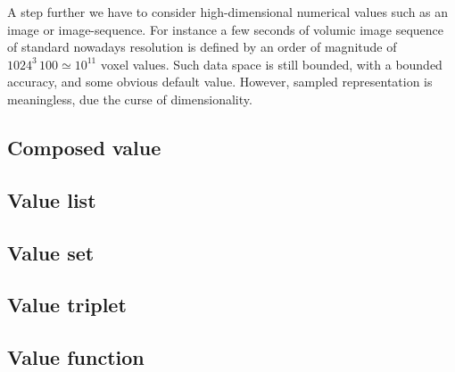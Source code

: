 \documentclass[a4,12pt]{article}
\begin{document}
A step further we have to consider high-dimensional numerical values such as an image or image-sequence. For instance a few seconds of volumic image sequence of standard nowadays resolution is defined by an order of magnitude of $1024^3 \, 100 \simeq 10^11$ voxel values. Such data space is still bounded, with a bounded accuracy, and some obvious default value. However, sampled representation is meaningless, due the curse of dimensionality.

\subsection*{Composed value} 

\subsection*{Value list} 

\subsection*{Value set} 

\subsection*{Value triplet} 

\subsection*{Value function} 

\fi

{\scriptsize  }

\end{document}
